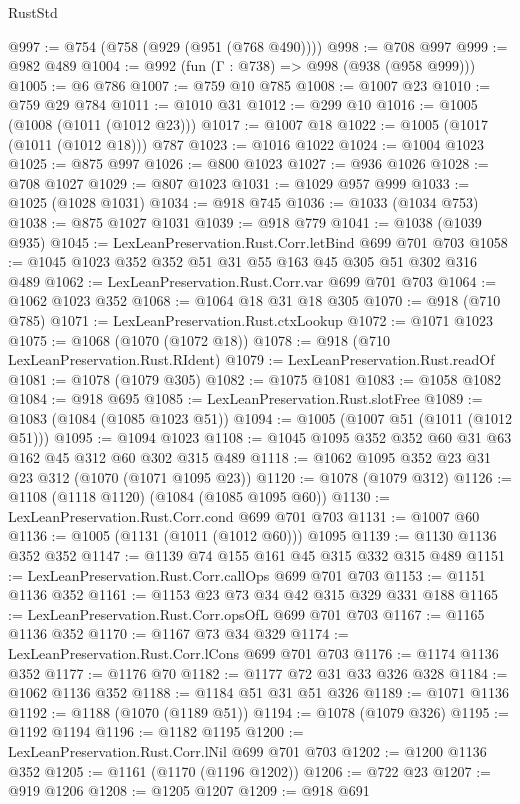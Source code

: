 \begin{lexlean}{RustStd}
\begin{coremodule}
@997 := @754 (@758 (@929 (@951 (@768 @490))))
@998 := @708 @997
@999 := @982 @489
@1004 := @992 (fun (Γ : @738) => @998 (@938 (@958 @999)))
@1005 := @6 @786
@1007 := @759 @10 @785
@1008 := @1007 @23
@1010 := @759 @29 @784
@1011 := @1010 @31
@1012 := @299 @10
@1016 := @1005 (@1008 (@1011 (@1012 @23)))
@1017 := @1007 @18
@1022 := @1005 (@1017 (@1011 (@1012 @18))) @787
@1023 := @1016 @1022
@1024 := @1004 @1023
@1025 := @875 @997
@1026 := @800 @1023
@1027 := @936 @1026
@1028 := @708 @1027
@1029 := @807 @1023
@1031 := @1029 @957 @999
@1033 := @1025 (@1028 @1031)
@1034 := @918 @745
@1036 := @1033 (@1034 @753)
@1038 := @875 @1027 @1031
@1039 := @918 @779
@1041 := @1038 (@1039 @935)
@1045 := LexLeanPreservation.Rust.Corr.letBind @699 @701 @703
@1058 := @1045 @1023 @352 @352 @51 @31 @55 @163 @45 @305 @51 @302 @316 @489
@1062 := LexLeanPreservation.Rust.Corr.var @699 @701 @703
@1064 := @1062 @1023 @352
@1068 := @1064 @18 @31 @18 @305
@1070 := @918 (@710 @785)
@1071 := LexLeanPreservation.Rust.ctxLookup
@1072 := @1071 @1023
@1075 := @1068 (@1070 (@1072 @18))
@1078 := @918 (@710 LexLeanPreservation.Rust.RIdent)
@1079 := LexLeanPreservation.Rust.readOf
@1081 := @1078 (@1079 @305)
@1082 := @1075 @1081
@1083 := @1058 @1082
@1084 := @918 @695
@1085 := LexLeanPreservation.Rust.slotFree
@1089 := @1083 (@1084 (@1085 @1023 @51))
@1094 := @1005 (@1007 @51 (@1011 (@1012 @51)))
@1095 := @1094 @1023
@1108 := @1045 @1095 @352 @352 @60 @31 @63 @162 @45 @312 @60 @302 @315 @489
@1118 := @1062 @1095 @352 @23 @31 @23 @312 (@1070 (@1071 @1095 @23))
@1120 := @1078 (@1079 @312)
@1126 := @1108 (@1118 @1120) (@1084 (@1085 @1095 @60))
@1130 := LexLeanPreservation.Rust.Corr.cond @699 @701 @703
@1131 := @1007 @60
@1136 := @1005 (@1131 (@1011 (@1012 @60))) @1095
@1139 := @1130 @1136 @352 @352
@1147 := @1139 @74 @155 @161 @45 @315 @332 @315 @489
@1151 := LexLeanPreservation.Rust.Corr.callOps @699 @701 @703
@1153 := @1151 @1136 @352
@1161 := @1153 @23 @73 @34 @42 @315 @329 @331 @188
@1165 := LexLeanPreservation.Rust.Corr.opsOfL @699 @701 @703
@1167 := @1165 @1136 @352
@1170 := @1167 @73 @34 @329
@1174 := LexLeanPreservation.Rust.Corr.lCons @699 @701 @703
@1176 := @1174 @1136 @352
@1177 := @1176 @70
@1182 := @1177 @72 @31 @33 @326 @328
@1184 := @1062 @1136 @352
@1188 := @1184 @51 @31 @51 @326
@1189 := @1071 @1136
@1192 := @1188 (@1070 (@1189 @51))
@1194 := @1078 (@1079 @326)
@1195 := @1192 @1194
@1196 := @1182 @1195
@1200 := LexLeanPreservation.Rust.Corr.lNil @699 @701 @703
@1202 := @1200 @1136 @352
@1205 := @1161 (@1170 (@1196 @1202))
@1206 := @722 @23
@1207 := @919 @1206
@1208 := @1205 @1207
@1209 := @918 @691

\end{coremodule}
\end{lexlean}
